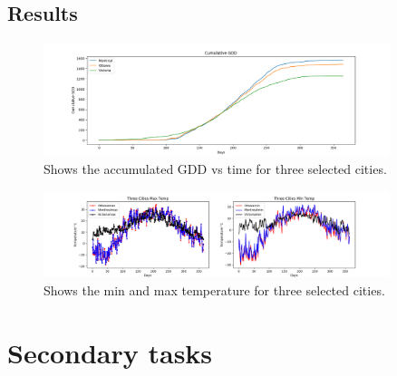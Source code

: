 \documentclass[12pt]{article}
\begin{document}
\subsection{Results}
	\begin{figure}[!htbp]
		\centering
		\includegraphics[width=0.9\textwidth]{../Plots/CumulativeGDD.png} 
		\caption{\scriptsize Shows the accumulated GDD vs time for three selected cities.}\label{GDDplot}		  
	\end{figure}

	\begin{figure}[!htbp]
		\centering
		\includegraphics[width=0.9\textwidth]{../Plots/CompareMaxMinTemp.png} 
		\caption{\scriptsize Shows the min and max temperature for three selected cities.}\label{GDDplot}		  
	\end{figure}

\pagebreak
\section{Secondary tasks}
\end{document}
